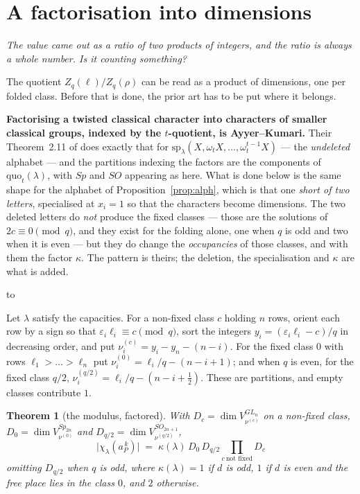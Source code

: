 \documentclass[11pt,a4paper]{article}
\newtheorem{theorem}{Theorem}[section]
\theoremstyle{definition}
\newenvironment{keybox}
  {\par\vspace{9pt}\begin{lrbox}{\fichabox}%
   \begin{minipage}{0.90\textwidth}\vspace{7pt}\setlength{\parskip}{3pt}}
  {\vspace{7pt}\end{minipage}\end{lrbox}%
   \par\noindent\hbox to \textwidth{\hfill
   \textcolor{azul}{\rule[-\dp\fichabox]{3.2pt}{\dimexpr\ht\fichabox+\dp\fichabox\relax}}%
   \colorbox{fondoficha}{\usebox{\fichabox}}\hfill}%
   \par\vspace{9pt}}
\begin{document}
\section{A factorisation into dimensions}\label{sec:dims}

\noindent\emph{The value came out as a ratio of two products of integers, and the ratio is always a whole number. Is it counting something?}

The quotient $Z_q(\ell)/Z_q(\rho)$ can be read as a product of dimensions, one per folded class. Before
that is done, the prior art has to be put where it belongs.

\begin{keybox}
\textbf{Factorising a twisted classical character into characters of smaller classical groups,
indexed by the $t$-quotient, is Ayyer--Kumari.} Their Theorem~2.11 of \cite{AK22} does exactly that
for $\mathrm{sp}_\lambda(X,\omega_tX,\dots,\omega_t^{t-1}X)$ --- the \emph{undeleted} alphabet ---
and the partitions indexing the factors are the components of $\mathrm{quo}_t(\lambda)$, with $Sp$
and $SO$ appearing as here. What is done below is the same shape for the alphabet of
Proposition~\ref{prop:alph}, which is that one \emph{short of two letters}, specialised at
$x_i=1$ so that the characters become dimensions. The two deleted letters do \emph{not} produce the
fixed classes --- those are the solutions of $2c\equiv0\pmod q$, and they exist for the folding
alone, one when $q$ is odd and two when it is even --- but they do change the \emph{occupancies} of
those classes, and with them the factor $\kappa$. The pattern is theirs; the deletion, the specialisation and
$\kappa$ are what is added.
\end{keybox}

Let $\lambda$ satisfy the capacities. For a non-fixed class $c$ holding $n$ rows, orient each row by
a sign so that $\varepsilon_i\ell_i\equiv c\pmod q$, sort the integers
$y_i=(\varepsilon_i\ell_i-c)/q$ in decreasing order, and put
$\nu^{(c)}_i=y_i-y_n-(n-i)$. For the fixed class $0$ with rows $\ell_1>\dots>\ell_n$ put
$\nu^{(0)}_i=\ell_i/q-(n-i+1)$; and when $q$ is even, for the fixed class $q/2$,
$\nu^{(q/2)}_i=\ell_i/q-(n-i+\tfrac12)$. These are partitions, and empty classes contribute $1$.

\begin{theorem}[the modulus, factored]\label{thm:dims}
With $D_c=\dim V^{GL_n}_{\nu^{(c)}}$ on a non-fixed class, $D_0=\dim V^{Sp_{2n}}_{\nu^{(0)}}$ and
$D_{q/2}=\dim V^{SO_{2n+1}}_{\nu^{(q/2)}}$,
\[
\boxed{\;
\bigl|\chi_\lambda(a_P^{\,k})\bigr|\;=\;\kappa(\lambda)\,D_0\,D_{q/2}
\prod_{c\ \text{not fixed}} D_c \;}
\]
omitting $D_{q/2}$ when $q$ is odd, where $\kappa(\lambda)=1$ if $d$ is odd, $1$ if $d$ is even and
the free place lies in the class $0$, and $2$ otherwise.
\end{theorem}
\end{document}
